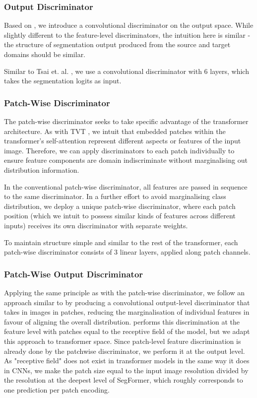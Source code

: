 \documentclass[a4paper,12pt]{report}
\begin{document}
\subsubsection{Output Discriminator}

Based on \cite{tsai_learning_2020}, we introduce a convolutional discriminator on the output space. While slightly different to the feature-level discriminators, the intuition here is similar - the structure of segmentation output produced from the source and target domains should be similar.

Similar to Tsai et. al. \cite{tsai_learning_2020}, we use a convolutional discriminator with 6 layers, which takes the segmentation logits as input.

\subsubsection{Patch-Wise Discriminator}
The patch-wise discriminator seeks to take specific advantage of the transformer architecture. As with TVT \cite{yang_tvt_2021}, we intuit that embedded patches within the transformer's self-attention represent different aspects or features of the input image. Therefore, we can apply discriminators to each patch individually to ensure feature components are domain indiscriminate without marginalising out distribution information.

In the conventional patch-wise discriminator, all features are passed in sequence to the same discriminator. In a further effort to avoid marginalising class distribution, we deploy a unique patch-wise discriminator, where each patch position (which we intuit to possess similar kinds of features across different inputs) receives its own discriminator with separate weights.

To maintain structure simple and similar to the rest of the transformer, each patch-wise discriminator consists of 3 linear layers, applied along patch channels.

\subsubsection{Patch-Wise Output Discriminator}
Applying the same principle as with the patch-wise discriminator, we follow an approach similar to \cite{hoffman_fcns_2016} by producing a convolutional output-level discriminator that takes in images in patches, reducing the marginalisation of individual features in favour of aligning the overall distribution. \cite{hoffman_fcns_2016} performs this discrimination at the feature level with patches equal to the receptive field of the model, but we adapt this approach to transformer space. Since patch-level feature discrimination is already done by the patchwise discriminator, we perform it at the output level. As "receptive field" does not exist in transformer models in the same way it does in CNNs, we make the patch size equal to the input image resolution divided by the resolution at the deepest level of SegFormer, which roughly corresponds to one prediction per patch encoding.
\end{document}
